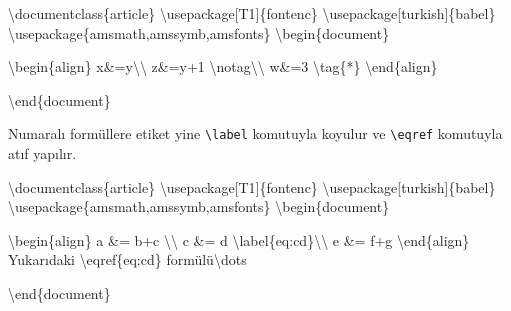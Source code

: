\documentclass[
  letterpaper,
  DIV=11,
  numbers=noendperiod]{scrreprt}
\newenvironment{Shaded}{\begin{snugshade}}{\end{snugshade}}
\newcommand{\BuiltInTok}[1]{\textcolor[rgb]{0.00,0.23,0.31}{#1}}
\newcommand{\ExtensionTok}[1]{\textcolor[rgb]{0.00,0.23,0.31}{#1}}
\newcommand{\FunctionTok}[1]{\textcolor[rgb]{0.28,0.35,0.67}{#1}}
\newcommand{\KeywordTok}[1]{\textcolor[rgb]{0.00,0.23,0.31}{#1}}
\newcommand{\NormalTok}[1]{\textcolor[rgb]{0.00,0.23,0.31}{#1}}
\newcommand{\SpecialCharTok}[1]{\textcolor[rgb]{0.37,0.37,0.37}{#1}}
\newcommand{\SpecialStringTok}[1]{\textcolor[rgb]{0.13,0.47,0.30}{#1}}
\begin{document}
\begin{Shaded}
\begin{Highlighting}[]
\BuiltInTok{\textbackslash{}documentclass}\NormalTok{\{}\ExtensionTok{article}\NormalTok{\}}
\BuiltInTok{\textbackslash{}usepackage}\NormalTok{[T1]\{}\ExtensionTok{fontenc}\NormalTok{\}}
\BuiltInTok{\textbackslash{}usepackage}\NormalTok{[turkish]\{}\ExtensionTok{babel}\NormalTok{\}}
\BuiltInTok{\textbackslash{}usepackage}\NormalTok{\{}\ExtensionTok{amsmath,amssymb,amsfonts}\NormalTok{\}}
\KeywordTok{\textbackslash{}begin}\NormalTok{\{}\ExtensionTok{document}\NormalTok{\}}

\KeywordTok{\textbackslash{}begin}\NormalTok{\{}\ExtensionTok{align}\NormalTok{\}}
\SpecialStringTok{ x\&=y}\SpecialCharTok{\textbackslash{}\textbackslash{}}
\SpecialStringTok{ z\&=y+1 }\SpecialCharTok{\textbackslash{}notag\textbackslash{}\textbackslash{}}
\SpecialStringTok{ w\&=3 }\SpecialCharTok{\textbackslash{}tag}\SpecialStringTok{\{*\}}
\KeywordTok{\textbackslash{}end}\NormalTok{\{}\ExtensionTok{align}\NormalTok{\}}

\KeywordTok{\textbackslash{}end}\NormalTok{\{}\ExtensionTok{document}\NormalTok{\}}
\end{Highlighting}
\end{Shaded}

Numaralı formüllere etiket yine \texttt{\textbackslash{}label} komutuyla
koyulur ve \texttt{\textbackslash{}eqref} komutuyla atıf yapılır.

\begin{Shaded}
\begin{Highlighting}[]
\BuiltInTok{\textbackslash{}documentclass}\NormalTok{\{}\ExtensionTok{article}\NormalTok{\}}
\BuiltInTok{\textbackslash{}usepackage}\NormalTok{[T1]\{}\ExtensionTok{fontenc}\NormalTok{\}}
\BuiltInTok{\textbackslash{}usepackage}\NormalTok{[turkish]\{}\ExtensionTok{babel}\NormalTok{\}}
\BuiltInTok{\textbackslash{}usepackage}\NormalTok{\{}\ExtensionTok{amsmath,amssymb,amsfonts}\NormalTok{\}}
\KeywordTok{\textbackslash{}begin}\NormalTok{\{}\ExtensionTok{document}\NormalTok{\}}

\KeywordTok{\textbackslash{}begin}\NormalTok{\{}\ExtensionTok{align}\NormalTok{\}}
\SpecialStringTok{ a \&= b+c }\SpecialCharTok{\textbackslash{}\textbackslash{}}
\SpecialStringTok{ c \&= d  }\SpecialCharTok{\textbackslash{}label}\SpecialStringTok{\{eq:cd\}}\SpecialCharTok{\textbackslash{}\textbackslash{}}
\SpecialStringTok{ e \&= f+g}
\KeywordTok{\textbackslash{}end}\NormalTok{\{}\ExtensionTok{align}\NormalTok{\}}
\NormalTok{Yukarıdaki }\KeywordTok{\textbackslash{}eqref}\NormalTok{\{}\ExtensionTok{eq:cd}\NormalTok{\}}
\NormalTok{formülü}\FunctionTok{\textbackslash{}dots}

\KeywordTok{\textbackslash{}end}\NormalTok{\{}\ExtensionTok{document}\NormalTok{\}}
\end{Highlighting}
\end{Shaded}
\end{document}
